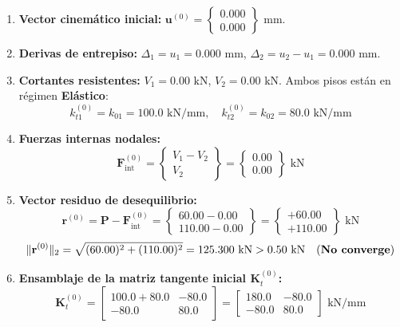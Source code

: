 \documentclass[11pt,letterpaper]{article}
\begin{document}
\begin{stepbox}
\begin{enumerate}
    \item \textbf{Vector cinemático inicial:} $\mathbf{u}^{(0)} = \begin{Bmatrix} 0.000 \\ 0.000 \end{Bmatrix}\text{ mm}$.
    \item \textbf{Derivas de entrepiso:} $\Delta_1 = u_1 = 0.000\text{ mm}$, $\Delta_2 = u_2 - u_1 = 0.000\text{ mm}$.
    \item \textbf{Cortantes resistentes:} $V_1 = 0.00\text{ kN}$, $V_2 = 0.00\text{ kN}$. Ambos pisos están en régimen \textbf{Elástico}:
    \[
        k_{t1}^{(0)} = k_{01} = 100.0\text{ kN/mm}, \quad k_{t2}^{(0)} = k_{02} = 80.0\text{ kN/mm}
    \]
    \item \textbf{Fuerzas internas nodales:}
    \[
        \mathbf{F}_{\text{int}}^{(0)} = \begin{Bmatrix} V_1 - V_2 \\ V_2 \end{Bmatrix} = \begin{Bmatrix} 0.00 \\ 0.00 \end{Bmatrix}\text{ kN}
    \]
    \item \textbf{Vector residuo de desequilibrio:}
    \[
        \mathbf{r}^{(0)} = \mathbf{P} - \mathbf{F}_{\text{int}}^{(0)} = \begin{Bmatrix} 60.00 - 0.00 \\ 110.00 - 0.00 \end{Bmatrix} = \begin{Bmatrix} +60.00 \\ +110.00 \end{Bmatrix}\text{ kN}
    \]
    \[
        \|\mathbf{r}^{(0)}\|_2 = \sqrt{(60.00)^2 + (110.00)^2} = 125.300\text{ kN} > 0.50\text{ kN} \quad (\text{\bfseries No converge})
    \]
    \item \textbf{Ensamblaje de la matriz tangente inicial $\mathbf{K}_t^{(0)}$:}
    \[
        \mathbf{K}_t^{(0)} = \begin{bmatrix} 100.0 + 80.0 & -80.0 \\ -80.0 & 80.0 \end{bmatrix} = \begin{bmatrix} 180.0 & -80.0 \\ -80.0 & 80.0 \end{bmatrix}\text{ kN/mm}
    \]
    \[
\]
\end{enumerate}
\end{stepbox}
\end{document}
